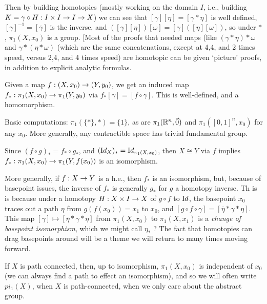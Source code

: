 \documentclass[12pt]{article}
\begin{document}
\ssk

Then by building homotopies (mostly working on the domain $I$,
i.e., building $K=\gamma\circ H:I\times I\rightarrow I\rightarrow X$)
we can see that $[\gamma][\eta] = [\gamma*\eta]$ is well defined,
$[\gamma]^{-1}=[\overline{\gamma}]$ is the inverse, and 
$([\gamma][\eta])[\omega] = [\gamma]([\eta][\omega])$, so 
under $*$, $\pi_1(X,x_0)$ is a group. [Most of the proofs that
needed maps (like $(\gamma*\eta)*\omega$ and $\gamma*(\eta*\omega)$
(which are the same concatenations, except at 4,4, and 2 times speed, versus 
2,4, and 4 times speed) are homotopic can be given `picture' proofs, 
in addition to explicit analytic formulas.

\ssk

Given a map $f:(X,x_0)\rightarrow (Y,y_0)$, we get an induced map
$f_*:\pi_1(X,x_0)\rightarrow \pi_1(Y,y_0)$ via $f_*[\gamma]=[f\circ\gamma]$.
This is well-defined, and a homomorphism.

\ssk

Basic computations: $\pi_1(\{*\},*) = \{1\}$, as are 
$\pi_1({\mathbb R}^n,\vec{0})$ and $\pi_1([0,1]^n,x_0)$ for any
$x_0$. More generally, any contractible space has trivial fundamental
group.

\msk

Since $(f\circ g)_*=f_*\circ g_*$, and $({\textrm Id}_X)_*={\textrm Id}_{\pi_1(X,x_0)}$,
then $X\cong Y$ via $f$ implies $f_*:\pi_1(X,x_0)\rightarrow \pi_1(Y,f(x_0))$
is an isomorphism.

\ssk

More generally, if $f:X\rightarrow Y$ is a h.e., then $f_*$ is an isomorphism,
but, because of basepoint issues, the inverse of $f_*$ is generally
 $g_*$ for $g$ a homotopy inverse. Th is is because under
a homotopy $H:X\times I\rightarrow X$ of $g\circ f$ to ${\textrm Id}$,
the basepoint $x_0$ traces out a path $\eta$ from $g(f(x_0))=x_1$ to $x_0$,
and $[g\circ f\circ\gamma] = [\overline{\eta}*\gamma *\eta]$.
This map $[\gamma]\mapsto [\overline{\eta}*\gamma *\eta]$ from
$\pi_1(X,x_0)$ to $\pi_1(X,x_1)$ is a {\it change of basepoint 
isomorphism}, which we might call $\eta_*$ ? The fact that homotopies
can drag basepoints around will be a theme we will return to 
many times moving forward.

\ssk

If $X$ is path connected, then, up to isomorphism, $\pi_1(X,x_0)$ 
is independent of $x_0$ (we can always find a path to effect an 
isomorphism), and so we will often write $pi_1(X)$, when $X$ is 
path-connected, when we only care about the abstract group.
\end{document}
